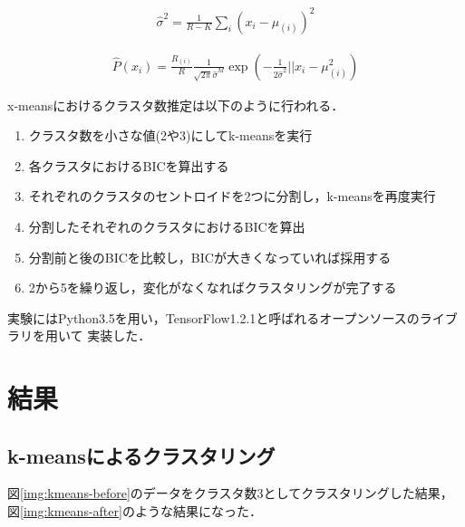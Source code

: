 \documentclass[10pt,a4j,twocolumn]{ltjsarticle}
\def\figref#1{図\ref{#1}}
\begin{document}
\begin{align}
  \hat{\sigma}^2 = \frac{1}{R-K}\sum_i\left(x_i - \mu_{(i)}\right)^2
\end{align}

\begin{align}
  \hat{P}(x_i) = \frac{R_{(i)}}{R}\frac{1}{\sqrt{2\pi}\hat{\sigma}^M}
    \exp\left(-\frac{1}{2\hat{\sigma}^2}||x_i-\mu_{(i)}^2\right)
\end{align}

x-meansにおけるクラスタ数推定は以下のように行われる．
\begin{enumerate}
  \item クラスタ数を小さな値(2や3)にしてk-meansを実行
  \item 各クラスタにおけるBICを算出する
  \item それぞれのクラスタのセントロイドを2つに分割し，k-meansを再度実行
  \item 分割したそれぞれのクラスタにおけるBICを算出
  \item 分割前と後のBICを比較し，BICが大きくなっていれば採用する
  \item 2から5を繰り返し，変化がなくなればクラスタリングが完了する
\end{enumerate}

実験にはPython3.5を用い，TensorFlow1.2.1と呼ばれるオープンソースのライブラリを用いて
実装した．

\section{結果}
\subsection{k-meansによるクラスタリング}
\figref{img:kmeans-before}のデータをクラスタ数3としてクラスタリングした結果，
\figref{img:kmeans-after}のような結果になった．
\end{document}
